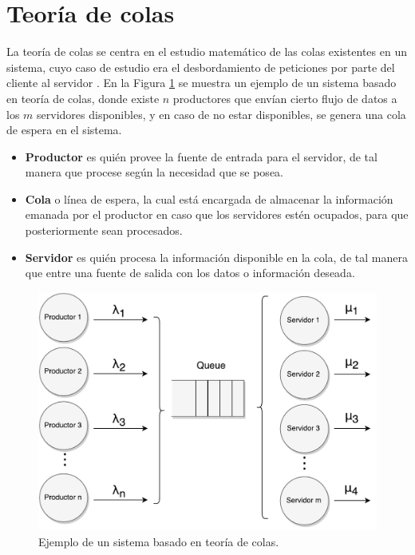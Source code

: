 \section{Teoría de colas}
\label{sec:teoriaColas}

La teoría de colas se centra en el estudio matemático de las colas existentes en un sistema, cuyo caso de estudio era el desbordamiento de peticiones por parte del cliente al servidor \citep{queueingtheory}. En la Figura \ref{fig:teoriaColas} se muestra un ejemplo de un sistema basado en teoría de colas, donde existe $n$ productores que envían cierto flujo de datos a los $m$ servidores disponibles, y en caso de no estar disponibles, se genera una cola de espera en el sistema.

\begin{itemize}
	\item \textbf{Productor} es quién provee la fuente de entrada para el servidor, de tal manera que procese según la necesidad que se posea.
	\item \textbf{Cola} o línea de espera, la cual está encargada de almacenar la información emanada por el productor en caso que los servidores estén ocupados, para que posteriormente sean procesados.
	\item \textbf{Servidor} es quién procesa la información disponible en la cola, de tal manera que entre una fuente de salida con los datos o información deseada.
\end{itemize}

\begin{figure}[!ht]
	\centering
	\includegraphics[scale=0.6]{images/TeoriaColas.pdf}
	\caption{Ejemplo de un sistema basado en teoría de colas.}
	\label{fig:teoriaColas}
\end{figure}

